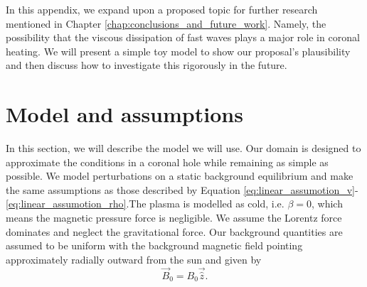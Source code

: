 In this appendix, we expand upon a proposed topic for further research mentioned in Chapter \ref{chap:conclusions_and_future_work}. Namely, the possibility that the viscous dissipation of fast waves plays a major role in coronal heating. We will present a simple toy model to show our proposal's plausibility and then discuss how to investigate this rigorously in the future.

\section{Model and assumptions}

In this section, we will describe the model we will use. Our domain is designed to approximate the conditions in a coronal hole while remaining as simple as possible. We model perturbations on a static background equilibrium and make the same assumptions as those described by Equation \eqref{eq:linear_assumotion_v}-\eqref{eq:linear_assumotion_rho}.The plasma is modelled as cold, i.e. $\beta=0$, which means the magnetic pressure force is negligible. We assume the Lorentz force dominates and neglect the gravitational force. Our background quantities are assumed to be uniform with the background magnetic field pointing approximately radially outward from the sun and given by
\begin{equation}
    \vec{B}_0 = B_0\vec{\hat{z}}.
\end{equation}


